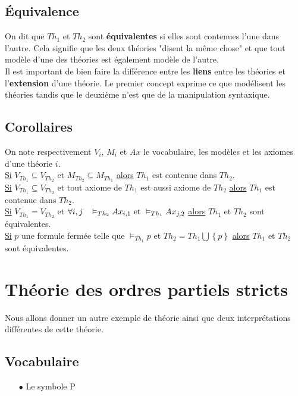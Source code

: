 \subsection*{Équivalence}
On dit que $Th_1$ et $Th_2$ sont \textbf{équivalentes} si elles sont contenues l'une dans l'autre. Cela signifie que les deux théories "disent la même chose" et que tout modèle d'une des théories est également modèle de l'autre.\\

Il est important de bien faire la différence entre les \textbf{liens} entre les théories et l'\textbf{extension} d'une théorie. Le premier concept exprime ce que modélisent les théories tandis que le deuxième n'est que de la manipulation syntaxique.

\subsection*{Corollaires}
On note respectivement $V_i$, $M_i$ et $Ax$ le vocabulaire, les modèles et les axiomes d'une théorie $i$. \\

\noindent \underline{Si} $V_{Th_1} \subseteq V_{Th_2}$ et $M_{Th_2} \subseteq M_{Th_1}$ \underline{alors} $Th_1$ est contenue dans $Th_2$. \\

\noindent \underline{Si} $V_{Th_1} \subseteq V_{Th_2}$ et tout axiome de $Th_1$ est aussi axiome de $Th_2$ \underline{alors} $Th_1$ est contenue dans $Th_2$. \\

\noindent \underline{Si} $V_{Th_1} = V_{Th_2}$ et $\forall i,j \hspace{0.3cm} \vDash_{Th_2} Ax_{i,1} \textrm{ et } \vDash_{Th_1} Ax_{j,2} $ \underline{alors} $Th_1$ et $Th_2$ sont équivalentes. \\

\noindent \underline{Si} $p$ une formule fermée telle que $\vDash_{Th_1} p$ et $Th_2 = Th_1 \bigcup \left\lbrace p \right\rbrace$ \underline{alors} $Th_1$ et $Th_2$ sont équivalentes. \\

\section{Théorie des ordres partiels stricts}

Nous allons donner un autre exemple de théorie ainsi que deux interprétations différentes de cette théorie.
\subsection*{Vocabulaire}
\begin{itemize}
\item[$\bullet$] Le symbole P
\end{itemize}
